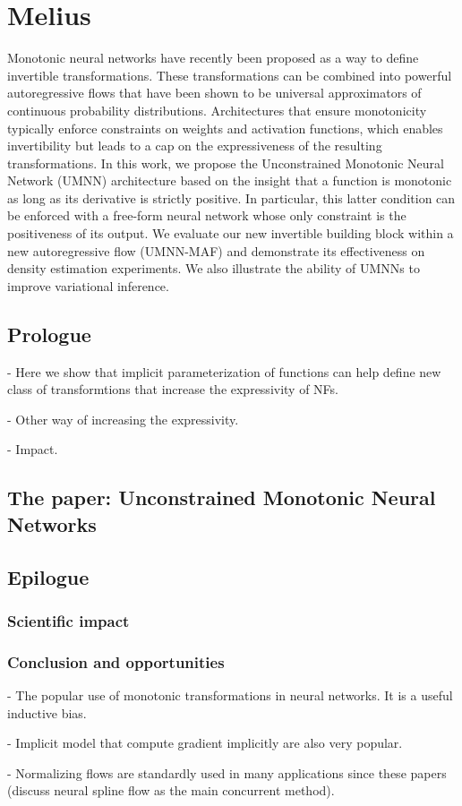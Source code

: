 \chapter{Melius}\label{ch:05}

\begin{chapter_outline}

Monotonic neural networks have recently been proposed as a way to define invertible transformations.
These transformations can be combined into powerful autoregressive flows that have been shown to be universal approximators of continuous probability distributions.
Architectures that ensure monotonicity typically enforce constraints on weights and activation functions, which enables invertibility but leads to a cap on the expressiveness of the resulting transformations.
In this work, we propose the Unconstrained Monotonic Neural Network (UMNN) architecture based on the insight that a function is monotonic as long as its derivative is strictly positive. In particular, this latter condition can be enforced with a free-form neural network whose only constraint is the positiveness of its output.
We evaluate our new invertible building block within a new autoregressive flow (UMNN-MAF) and demonstrate its effectiveness on density estimation experiments.
We also illustrate the ability of UMNNs to improve variational inference.
\end{chapter_outline}

\section{Prologue}
- Here we show that implicit parameterization of functions can help define new class of transformtions that increase the expressivity of NFs.

- Other way of increasing the expressivity.

- Impact.

\section{The paper: Unconstrained Monotonic Neural Networks}


\section{Epilogue}

\subsection{Scientific impact}

\subsection{Conclusion and opportunities}
- The popular use of monotonic transformations in neural networks. It is a useful inductive bias.

- Implicit model that compute gradient implicitly are also very popular.

- Normalizing flows are standardly used in many applications since these papers (discuss neural spline flow as the main concurrent method).
